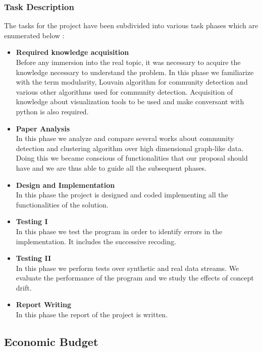 \subsubsection{Task Description}
The tasks for the project have been subdivided into various task phases which are enumerated below : 
\begin{itemize}
\item \textbf{Required knowledge acquisition}\\
Before any immersion into the real topic, it was necessary to acquire the knowledge
necessary to understand the problem. In this phase we familiarize with the term
modularity, Louvain algorithm for community detection and various other algorithms
used for community detection.
Acquisition of knowledge about visualization tools to be used and make conversant with python is also
required.
\item \textbf{Paper Analysis}\\ In this phase we analyze and compare several works about
community detection and clustering algorithm over high dimensional graph-like data.
Doing this we became conscious of functionalities that our proposal should have and we
are thus able to guide all the subsequent phases.

\item \textbf{Design and Implementation} \\ In this phase the project is designed and coded implementing all the functionalities of the solution. 
\item \textbf{Testing I}\\
In this phase we test the program in order to identify errors in
the implementation. It includes the successive recoding.
\item \textbf{Testing II}\\
In this phase we perform tests over synthetic and real data
streams. We evaluate the performance of the program and we study
the effects of concept drift.
\item \textbf{Report Writing}\\
In this phase the report of the project is written.
\end{itemize} 
\subsection{Economic Budget}
